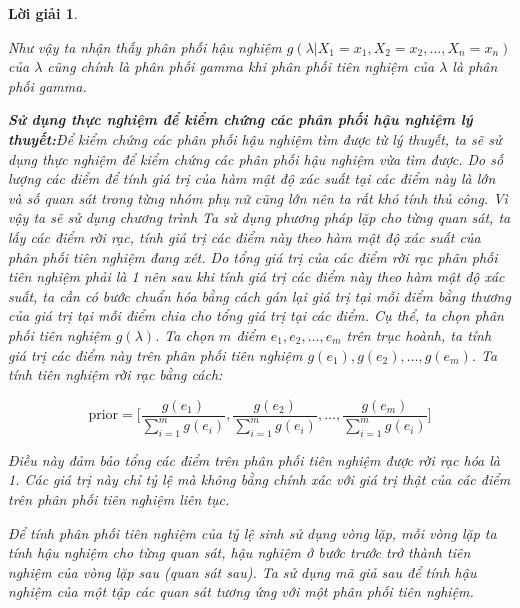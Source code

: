 \documentclass[14pt, a4paper]{article}
\theoremstyle{sltheorem}
\theoremstyle{soltheorem}
\newtheorem*{loigiai}{Lời giải}
\begin{document}
\begin{loigiai}
\begin{enumerate}
\begin{enumerate}[label=(\alph*)]
            Như vậy ta nhận thấy phân phối hậu nghiệm $g(\lambda \vert X_1 =x_1, X_2=x_2, \dots, X_n=x_n)$ của $\lambda$ cũng chính là phân phối gamma khi phân phối tiên nghiệm của $\lambda$ là phân phối gamma.
        \end{enumerate}

        \textbf{Sử dụng thực nghiệm để kiểm chứng các phân phối hậu nghiệm lý thuyết:}Để kiểm chứng các phân phối hậu nghiệm tìm được từ lý thuyết, ta sẽ sử dụng thực nghiệm để kiểm chứng các phân phối hậu nghiệm vừa tìm được.
        Do số lượng các điểm để tính giá trị của hàm mật độ xác suất tại các điểm này là lớn và số quan sát trong từng nhóm phụ nữ cũng lớn nên ta rất khó tính thủ công.
        Vì vậy ta sẽ sử dụng chương trình
        Ta sử dụng phương pháp lặp cho từng quan sát, ta lấy các điểm rời rạc, tính giá trị các điểm này theo hàm mật độ xác suất của phân phối tiên nghiệm đang xét.
        Do tổng giá trị của các điểm rời rạc phân phối tiên nghiệm phải là 1 nên sau khi tính giá trị các điểm này theo hàm mật độ xác suất, ta cần có bước chuẩn hóa bằng cách gán lại giá trị tại mỗi điểm bằng thương của giá trị tại mỗi điểm chia cho tổng giá trị tại các điểm.
        Cụ thể, ta chọn phân phối tiên nghiệm $g(\lambda)$.
        Ta chọn $m$ điểm $e_1, e_2, \dots, e_m$ trên trục hoành, ta tính giá trị các điểm này trên phân phối tiên nghiệm $g(e_1), g(e_2), \dots, g(e_m)$.
        Ta tính tiên nghiệm rời rạc bằng cách:

        \begin{equation*}
            \text{prior} = \Big \lbrack \dfrac{g(e_1)}{\sum_{i=1}^m g(e_i)}, \dfrac{g(e_2)}{\sum_{i=1}^m g(e_i)}, \dots, \dfrac{g(e_m)}{\sum_{i=1}^m g(e_i)} \Big \rbrack
        \end{equation*}

        Điều này đảm bảo tổng các điểm trên phân phối tiên nghiệm được rời rạc hóa là 1.
        Các giá trị này chỉ tỷ lệ mà không bằng chính xác với giá trị thật của các điểm trên phân phối tiên nghiệm liên tục.

        Để tính phân phối tiên nghiệm của tỷ lệ sinh sử dụng vòng lặp, mỗi vòng lặp ta tính hậu nghiệm cho từng quan sát, hậu nghiệm ở bước trước trở thành tiên nghiệm của vòng lặp sau (quan sát sau).
        Ta sử dụng mã giả sau để tính hậu nghiệm của một tập các quan sát tương ứng với một phân phối tiên nghiệm.



\end{enumerate}
\end{loigiai}
\end{document}
